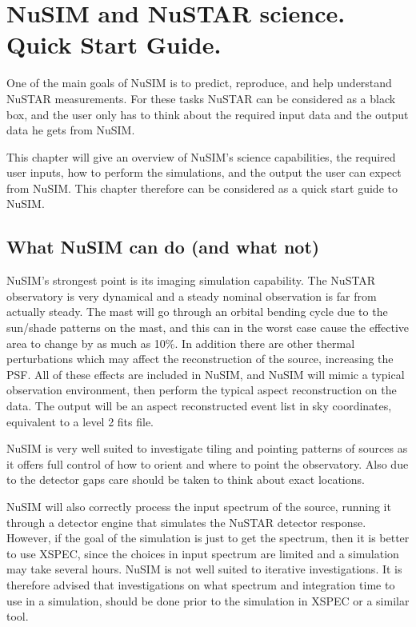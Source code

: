 %

\chapter{NuSIM and NuSTAR science. Quick Start Guide.}
One of the main goals of NuSIM is to predict, reproduce, and help understand NuSTAR measurements.
For these tasks NuSTAR can be considered as a black box, and the user only has to think about the required input data and the output data he gets from NuSIM. 

This chapter will give an overview of NuSIM's science capabilities, the required user inputs, how to perform the simulations, and the output the user can expect from NuSIM. This chapter therefore can be considered as a quick start guide to NuSIM.

\section{What NuSIM can do (and what not)}

NuSIM's strongest point is its imaging simulation capability. The NuSTAR observatory is very dynamical and a steady nominal observation is far from actually steady. The mast will go through an orbital bending cycle due to the sun/shade patterns on the mast, and this can in the worst case cause the effective area to change  by as much as 10\%. In addition there are other thermal perturbations which may affect the reconstruction of the source, increasing the PSF. All of these effects are included in NuSIM, and NuSIM will mimic a typical observation environment, then perform the typical aspect reconstruction on the data. The output will be an aspect reconstructed event list in sky coordinates, equivalent to a level 2 fits file.

NuSIM is very well suited to investigate tiling and pointing patterns of sources as it offers full control of how to orient and where to point the observatory. Also due to the detector gaps care should be taken to think about exact locations.

NuSIM will also correctly process the input spectrum of the source, running it through a detector engine that simulates the NuSTAR detector response. However, if the goal of the simulation is just to get the spectrum, then it is better to use XSPEC, since the choices in input spectrum are limited and a simulation may take several hours. NuSIM is not well suited to iterative investigations. It is therefore advised that investigations on what spectrum and integration time to use in a simulation, should be done prior to the simulation in XSPEC or a similar tool.


